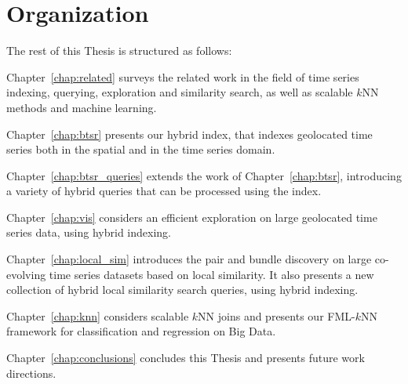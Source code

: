 \section{Organization}
\label{sec:org}

The rest of this Thesis is structured as follows:

\begin{description}
	\item Chapter~\ref{chap:related} surveys the related work in the field of time series indexing, querying, exploration and similarity search, as well as scalable $k$NN methods and machine learning.
	\item Chapter~\ref{chap:btsr} presents our hybrid \btsr index, that indexes geolocated time series both in the spatial and in the time series domain.
	\item Chapter~\ref{chap:btsr_queries} extends the work of Chapter~\ref{chap:btsr}, introducing a variety of hybrid queries that can be processed using the \btsr index.
	\item Chapter~\ref{chap:vis} considers an efficient exploration on large geolocated time series data, using hybrid indexing.
	\item Chapter~\ref{chap:local_sim} introduces the pair and bundle discovery on large co-evolving time series datasets based on local similarity. It also presents a new collection of hybrid local similarity search queries, using hybrid indexing.
	\item Chapter~\ref{chap:knn} considers scalable $k$NN joins and presents our FML-$k$NN framework for classification and regression on Big Data.
	\item Chapter~\ref{chap:conclusions} concludes this Thesis and presents future work directions.
\end{description}
